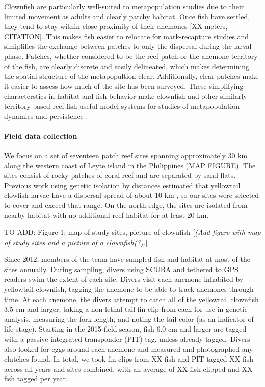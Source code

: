 \documentclass[12pt, oneside]{article}   	%
\begin{document}
Clownfish are particularly well-suited to metapopulation studies due to their limited movement as adults and clearly patchy habitat. Once fish have settled, they tend to stay within close proximity of their anemones [XX meters, CITATION]. This makes fish easier to relocate for mark-recapture studies and simiplifies the exchange between patches to only the dispersal during the larval phase. Patches, whether considered to be the reef patch or the anemone territory of the fish, are clearly discrete and easily delineated, which makes determining the spatial structure of the metapopultion clear. Additionally, clear patches make it easier to assess how much of the site has been surveyed. These simplifying characterstics in habitat and fish behavior make clownfish and other similarly territory-based reef fish useful model systems for studies of metapopulation dynamics and persistence \citep[e.g.][]{buston2013marine, salles_coral_2015, johnson2018integrating}.

\paragraph*{Field data collection}

We focus on a set of seventeen patch reef sites spanning approximately 30 km along the western coast of Leyte island in the Philippines (MAP FIGURE). The sites consist of rocky patches of coral reef and are separated by sand flats. Previous work using genetic isolation by distances estimated that yellowtail clowfish larvae have a dispersal spread of about 10 km \citep[range 4-27 km][]{pinsky2010using}, so our sites were selected to cover and exceed that range. On the north edge, the sites are isolated from nearby habitat with no additional reef habitat for at least 20 km. %

TO ADD: Figure 1: map of study sites, picture of clownfish
[\textit{(Add figure with map of study sites and a picture of a clownfish(?).}]

Since 2012, members of the team have sampled fish and habitat at most of the sites annually. During sampling, divers using SCUBA and tethered to GPS readers swim the extent of each site. Divers visit each anemone inhabited by yellowtail clownfish, tagging the anemone to be able to track anemones through time. At each anemone, the divers attempt to catch all of the yellowtail clownfish 3.5 cm and larger, taking a non-lethal tail fin-clip from each for use in genetic analysis, measuring the fork length, and noting the tail color (as an indicator of life stage). Starting in the 2015 field season, fish 6.0 cm and larger are tagged with a passive integrated transponder (PIT) tag, unless already tagged. Divers also looked for eggs around each anemone and measured and photographed any clutches found. In total, we took fin clips from XX fish and PIT-tagged XX fish across all years and sites combined, with an average of XX fish clipped and XX fish tagged per year.
\end{document}
